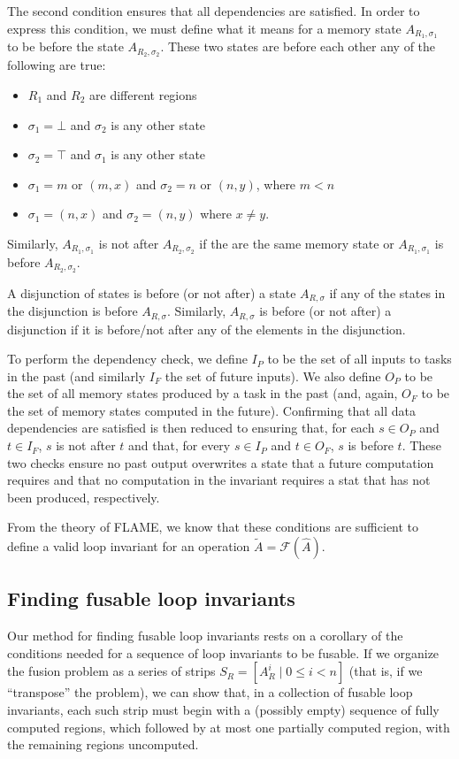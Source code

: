 \documentclass[12pt,letterpaper]{article}
\newcommand*{\opF}{\mathcal{F}}
\begin{document}
The second condition ensures that all dependencies are satisfied.
In order to express this condition, we must define what it means for a memory state $A_{R_1, \sigma_1}$ to be before the state $A_{R_2, \sigma_2}$.
These two states are before each other any of the following are true:
\begin{itemize}
\item $R_1$ and $R_2$ are different regions
\item $\sigma_1 = \bot$ and $\sigma_2$ is any other state
\item $\sigma_2 = \top$ and $\sigma_1$ is any other state
\item $\sigma_1 = m$ or $(m, x)$ and $\sigma_2 = n$ or $(n, y)$, where $m < n$
\item $\sigma_1 = (n, x)$ and $\sigma_2 = (n, y)$ where $x \neq y$.
\end{itemize}
Similarly, $A_{R_1, \sigma_1}$ is not after $A_{R_2, \sigma_2}$ if the are the same memory state or $A_{R_1, \sigma_1}$ is before $A_{R_2, \sigma_2}$.

A disjunction of states is before (or not after) a state $A_{R, \sigma}$ if any of the states in the disjunction is before $A_{R, \sigma}$.
Similarly, $A_{R, \sigma}$ is before (or not after) a disjunction if it is before/not after any of the elements in the disjunction.

To perform the dependency check, we define $I_P$ to be the set of all inputs to tasks in the past (and similarly $I_F$ the set of future inputs).
We also define $O_P$ to be the set of all memory states produced by a task in the past (and, again, $O_F$ to be the set of memory states computed in the future).
Confirming that all data dependencies are satisfied is then reduced to ensuring that, for each $s \in O_P$ and $t \in I_F$, $s$ is not after $t$ and that, for every $s \in I_P$ and $t \in O_F$, $s$ is before $t$.
These two checks ensure no past output overwrites a state that a future computation requires and that no computation in the invariant requires a stat that has not been produced, respectively.

From the theory of FLAME, we know that these conditions are sufficient to define a valid loop invariant for an operation $\widetilde{A} = \opF(\hat{A})$.

\subsection{Finding fusable loop invariants}
Our method for finding fusable loop invariants rests on a corollary of the conditions needed for a sequence of loop invariants to be fusable.
If we organize the fusion problem as a series of strips $S_R = [A_R^i \mid 0 \leq i < n]$ (that is, if we ``transpose'' the problem), we can show that, in a collection of fusable loop invariants, each such strip must begin with a (possibly empty) sequence of fully computed regions, which followed by at most one partially computed region, with the remaining regions uncomputed.
\end{document}
